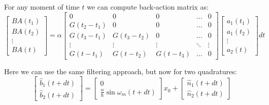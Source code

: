 For any moment of time $t$ we can compute back-action matrix as:
\begin{equation}
 \begin{bmatrix}
  BA(t_1)\\BA(t_2)\\\vdots\\BA(t)
 \end{bmatrix}
=\alpha
\begin{bmatrix}
 0 & 0 & 0 &\hdots & 0\\
 G(t_2-t_1) &0 &0 &\hdots & 0\\
 G(t_3-t_1) &G(t_3-t_2) &0 &\hdots & 0\\
\vdots &\vdots &\vdots &\ddots & \vdots\\
G(t-t_1) &G(t-t_2) &G(t-t_3) &\hdots & 0
\end{bmatrix}
\begin{bmatrix}
 a_1(t_1)\\a_1(t_2)\\\vdots\\a_2(t)
\end{bmatrix}
dt
\end{equation}

Here we can use the same filtering approach, but now for two quadratures:
\begin{equation}
 \begin{bmatrix}
  \hat{b}_1(t+dt)\\ \hat{b}_2(t+dt)
 \end{bmatrix}
=
\begin{bmatrix}
 0 \\ \frac{\alpha}{\hbar} \sin \omega_m(t+dt)
\end{bmatrix}
x_0 + 
\begin{bmatrix}
 \hat{n}_1(t+dt) \\ \hat{n}_2(t+dt)
\end{bmatrix}
\end{equation}

